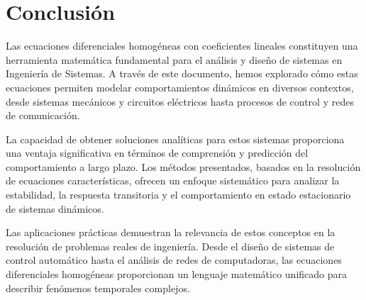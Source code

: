 \newpage
\section{Conclusión}

Las ecuaciones diferenciales homogéneas con coeficientes lineales constituyen una herramienta matemática fundamental para el análisis y diseño de sistemas en Ingeniería de Sistemas. A través de este documento, hemos explorado cómo estas ecuaciones permiten modelar comportamientos dinámicos en diversos contextos, desde sistemas mecánicos y circuitos eléctricos hasta procesos de control y redes de comunicación.

La capacidad de obtener soluciones analíticas para estos sistemas proporciona una ventaja significativa en términos de comprensión y predicción del comportamiento a largo plazo. Los métodos presentados, basados en la resolución de ecuaciones características, ofrecen un enfoque sistemático para analizar la estabilidad, la respuesta transitoria y el comportamiento en estado estacionario de sistemas dinámicos.

Las aplicaciones prácticas demuestran la relevancia de estos conceptos en la resolución de problemas reales de ingeniería. Desde el diseño de sistemas de control automático hasta el análisis de redes de computadoras, las ecuaciones diferenciales homogéneas proporcionan un lenguaje matemático unificado para describir fenómenos temporales complejos.
